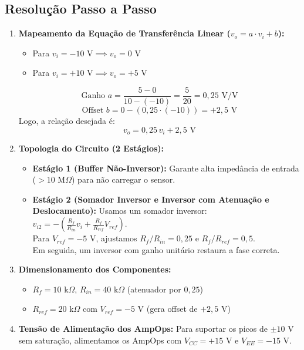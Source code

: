 \subsection*{Resolução Passo a Passo}
\begin{enumerate}
    \item \textbf{Mapeamento da Equação de Transferência Linear ($v_o = a \cdot v_i + b$):}
    \begin{itemize}
        \item Para $v_i = -10\text{ V} \implies v_o = 0\text{ V}$
        \item Para $v_i = +10\text{ V} \implies v_o = +5\text{ V}$
    \end{itemize}
    \begin{equation*}
        \text{Ganho } a = \frac{5 - 0}{10 - (-10)} = \frac{5}{20} = 0{,}25 \text{ V/V}
    \end{equation*}
    \begin{equation*}
        \text{Offset } b = 0 - (0{,}25 \cdot (-10)) = +2{,}5\text{ V}
    \end{equation*}
    Logo, a relação desejada é:
    \begin{equation*}
        v_o = 0{,}25 \, v_i + 2{,}5\text{ V}
    \end{equation*}

    \item \textbf{Topologia do Circuito (2 Estágios):}
    \begin{itemize}
        \item \textbf{Estágio 1 (Buffer Não-Inversor):} Garante alta impedância de entrada ($>10\text{ M}\Omega$) para não carregar o sensor.
        \item \textbf{Estágio 2 (Somador Inversor e Inversor com Atenuação e Deslocamento):}
        Usamos um somador inversor: $v_{i2} = -\left( \frac{R_f}{R_{in}} v_i + \frac{R_f}{R_{ref}} V_{ref} \right)$.\\
        Para $V_{ref} = -5\text{ V}$, ajustamos $R_f/R_{in} = 0{,}25$ e $R_f/R_{ref} = 0{,}5$.\\
        Em seguida, um inversor com ganho unitário restaura a fase correta.
    \end{itemize}

    \item \textbf{Dimensionamento dos Componentes:}
    \begin{itemize}
        \item $R_f = 10\text{ k}\Omega$, $R_{in} = 40\text{ k}\Omega$ (atenuador por $0{,}25$)
        \item $R_{ref} = 20\text{ k}\Omega$ com $V_{ref} = -5\text{ V}$ (gera offset de $+2{,}5\text{ V}$)
    \end{itemize}

    \item \textbf{Tensão de Alimentação dos AmpOps:}
    Para suportar os picos de $\pm 10\text{ V}$ sem saturação, alimentamos os AmpOps com $V_{CC} = +15\text{ V}$ e $V_{EE} = -15\text{ V}$.
\end{enumerate}



